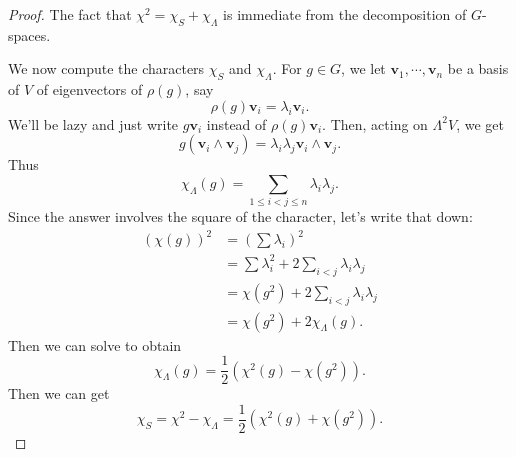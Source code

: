 \documentclass[a4paper]{article}
\begin{document}
\begin{proof}
  The fact that $\chi^2 = \chi_S + \chi_\Lambda$ is immediate from the decomposition of $G$-spaces.

  We now compute the characters $\chi_S$ and $\chi_\Lambda$. For $g \in G$, we let $\mathbf{v}_1, \cdots, \mathbf{v}_n$ be a basis of $V$ of eigenvectors of $\rho(g)$, say
  \[
    \rho(g) \mathbf{v}_i = \lambda_i \mathbf{v}_i.
  \]
  We'll be lazy and just write $g \mathbf{v}_i$ instead of $\rho(g) \mathbf{v}_i$. Then, acting on $\Lambda^2 V$, we get
  \[
    g(\mathbf{v}_i \wedge \mathbf{v}_j) = \lambda_i \lambda_j \mathbf{v}_i \wedge \mathbf{v}_j.
  \]
  Thus
  \[
    \chi_\Lambda(g) = \sum_{1 \leq i < j \leq n} \lambda_i \lambda_j.
  \]
  Since the answer involves the square of the character, let's write that down:
  \begin{align*}
    (\chi(g))^2 &= \left(\sum \lambda_i\right)^2 \\
    &= \sum \lambda_i^2 + 2 \sum_{i < j} \lambda_i \lambda_j \\
    &= \chi(g^2) + 2 \sum_{i < j} \lambda_i \lambda_j\\
    &= \chi(g^2) + 2 \chi_\Lambda(g).
  \end{align*}
  Then we can solve to obtain
  \[
    \chi_\Lambda(g) = \frac{1}{2}(\chi^2(g) - \chi(g^2)).
  \]
  Then we can get
  \[
    \chi_S = \chi^2 - \chi_\Lambda = \frac{1}{2}(\chi^2(g) + \chi(g^2)).
  \]
\end{proof}
\end{document}
